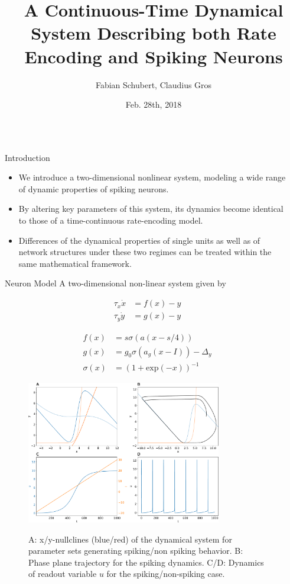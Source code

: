 \documentclass{beamer}
\title{A Continuous-Time Dynamical System Describing both Rate Encoding and Spiking Neurons}
\author{Fabian Schubert, Claudius Gros}
\institute{Institute for Theoretical Physics, Goethe University Frankfurt a.M.}
\date[Feb. 28th, 2018]{Feb. 28th, 2018}
\begin{document}
\begin{frame}[t]
\begin{columns}
\begin{column}{.45\textwidth}
\begin{block}{Introduction}
\begin{itemize}
\item We introduce a two-dimensional nonlinear system, modeling a wide range of dynamic 
properties of spiking neurons.
\item By altering key parameters of this system, its dynamics become identical to those of a 
time-continuous rate-encoding model.
\item Differences of the dynamical properties of single units as well as of network structures under 
these two regimes can be treated within the same mathematical framework.
\end{itemize}
\end{block}
\begin{block}{Neuron Model}
A two-dimensional non-linear system given by
\begin{minipage}[t]{.5\linewidth}
\begin{align*}
\tau_x \dot{x} &= f(x) - y  \\ 
\tau_y \dot{y} &= g(x) - y 
\end{align*}
\end{minipage}%
\begin{minipage}[t]{.5\linewidth}
\begin{align*}
f(x) &= s \sigma \left(a\left(x-s/4\right)\right)  \\
g(x) &= g_0 \sigma\left(a_g\left(x-I\right)\right) - \Delta_y \\
\sigma(x) &= \left(1+\mathrm{exp}(-x)\right)^{-1}
\end{align*}
\end{minipage}
\begin{figure}
\centering
\includegraphics[width=0.8\textwidth]{../figures/graphics/dynamics_combined_figure.pdf}
\label{fig:dynamics_illustr}
\caption{A: x/y-nullclines (blue/red) of the dynamical system for parameter sets generating spiking/non spiking behavior. B: Phase plane trajectory for the spiking dynamics. C/D: Dynamics of readout variable $u$ for the spiking/non-spiking case.}
\end{figure}
\end{block}
\end{column}
\begin{column}{.45\textwidth}


\end{column}
\end{columns}
\end{frame}
\end{document}

